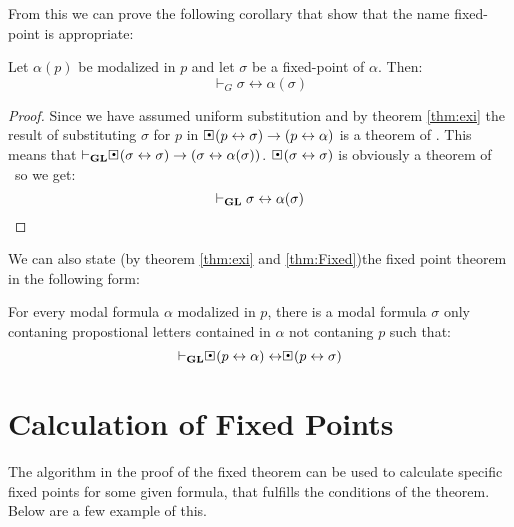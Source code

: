 \documentclass[../main.tex]{subfiles}
\begin{document}
From this we can prove the following corollary that show that the name
fixed-point is appropriate:
\begin{cor}
	Let $\alpha(p)$ be modalized in $p$ and let $\sigma$ be a fixed-point
	of $\alpha$. Then:
	\[\vdash_G\sigma\leftrightarrow\alpha(\sigma)\]
\end{cor}
\begin{proof}
	Since we have assumed uniform substitution and by theorem \ref{thm:exi}
	the result of substituting $\sigma$ for $p$ in
	$\sBox(p\leftrightarrow\sigma)\rightarrow(p\leftrightarrow\alpha)$ is a
	theorem of \GL. This means that
	$\vdash_\GL\sBox(\sigma\leftrightarrow\sigma)\rightarrow(\sigma\leftrightarrow\alpha(\sigma))$.
	$\sBox(\sigma\leftrightarrow\sigma)$ is obviously a theorem of \GL\ so
	we get:
	\[\vdash_{\text{\textbf{GL}}}\sigma\leftrightarrow\alpha(\sigma)\]
\end{proof}
We can also state  (by theorem \ref{thm:exi} and \ref{thm:Fixed})the fixed
point theorem in the following form:

\begin{cor}
	\label{cor:Fixed}
	For every modal formula $\alpha$ modalized in $p$, there is a modal formula
	$\sigma$ only contaning propostional letters contained in $\alpha$ not
	contaning $p$ such that:
	\[\vdash_\GL\sBox(p\leftrightarrow\alpha)\leftrightarrow\sBox(p\leftrightarrow\sigma)\]
\end{cor}
\section{Calculation of Fixed Points}

The algorithm in the proof of the fixed theorem can be used to calculate
specific fixed points for some given formula, that fulfills the conditions of
the theorem. Below are a few example of this.
\end{document}
